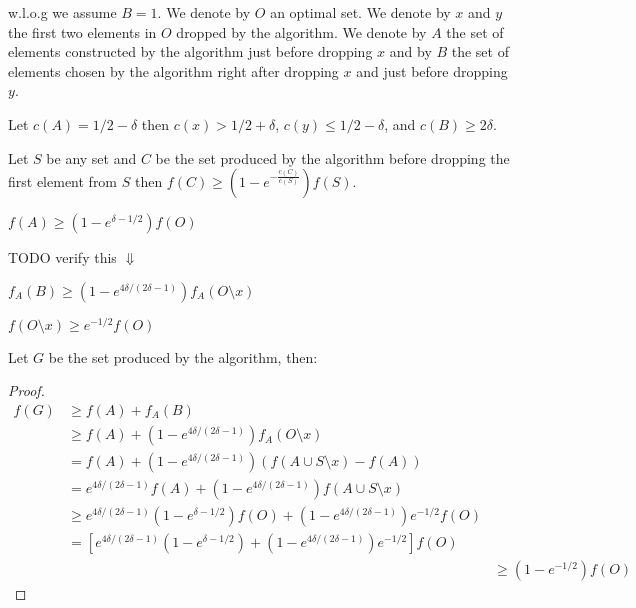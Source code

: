 w.l.o.g we assume $B = 1$.
We denote by $O$ an optimal set. 
We denote by $x$ and $y$ the first two elements in $O$ dropped by the algorithm.  
We denote by $A$ the set of elements constructed by the algorithm just before
dropping $x$ and by $B$ the set of elements chosen by the algorithm right after dropping $x$ 
and just before dropping $y$.

\begin{figure}[h]
\end{figure}

Let $c(A) = 1/2 - \delta$ 
then $c(x) > 1/2 + \delta$, $c(y) \leq 1/2 - \delta$, and $c(B) \geq 2\delta$.

\begin{lemma}
Let $S$ be any set and $C$ be the set produced by the algorithm 
before dropping the first element from $S$ then $f(C) \geq (1 - e^{-\frac{c(C)}{c(S)}})f(S)$.  
\end{lemma} 

\begin{observation}
$f(A) \geq (1 - e^{\delta - 1/2})f(O)$
\end{observation}

TODO verify this $\Downarrow$
\begin{observation}
$f_A(B) \geq (1 - e^{4\delta / (2\delta - 1)})f_A(O \setminus x)$
\end{observation}

\begin{observation}
$f(O \setminus x) \geq e^{-1/2}f(O)$
\end{observation}

Let $G$ be the set produced by the algorithm, then:
\begin{proof}
\def\arraystretch{1.5}
$$
\begin{array}{lll}
% 
f(G) & \geq f(A) + f_A(B)
\\& \geq f(A) + (1 - e^{4\delta / (2\delta - 1)})f_A(O \setminus x)
\\& = f(A) + (1 - e^{4\delta / (2\delta - 1)})(f(A \cup S \setminus x) - f(A))
\\& = e^{4\delta / (2\delta - 1)}f(A) 
	+ (1 - e^{4\delta / (2\delta - 1)})f(A \cup S \setminus x)
\\& \geq e^{4\delta / (2\delta - 1)}(1 - e^{\delta - 1/2})f(O)
	+ (1 - e^{4\delta / (2\delta - 1)})e^{-1/2}f(O)
\\& = [
		e^{4\delta / (2\delta - 1)}(1 - e^{\delta - 1/2}) + (1 - e^{4\delta / (2\delta - 1)})e^{-1/2}
		]f(O)
\\&& \geq (1-e^{-1/2})f(O)
% 
\end{array}
$$
\end{proof}